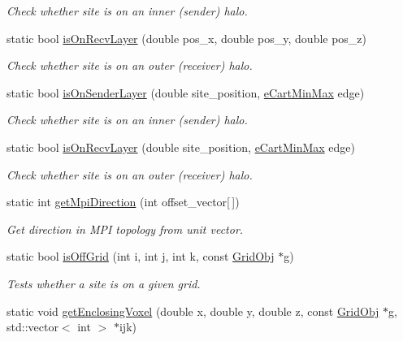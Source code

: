 \begin{DoxyCompactItemize}
\begin{DoxyCompactList}\small\item\em Check whether site is on an inner (sender) halo. \end{DoxyCompactList}\item 
static bool \hyperlink{class_grid_utils_abfec29d90b6942de2f3c52c225a4d888}{is\+On\+Recv\+Layer} (double pos\+\_\+x, double pos\+\_\+y, double pos\+\_\+z)
\begin{DoxyCompactList}\small\item\em Check whether site is on an outer (receiver) halo. \end{DoxyCompactList}\item 
static bool \hyperlink{class_grid_utils_a9179e27b25b1be249edd6d22455d57bd}{is\+On\+Sender\+Layer} (double site\+\_\+position, \hyperlink{_grid_utils_8h_a0cc91691e907a6a03b129d18a62fe33d}{e\+Cart\+Min\+Max} edge)
\begin{DoxyCompactList}\small\item\em Check whether site is on an inner (sender) halo. \end{DoxyCompactList}\item 
static bool \hyperlink{class_grid_utils_a381a3ef0d42132313081b5c06f732092}{is\+On\+Recv\+Layer} (double site\+\_\+position, \hyperlink{_grid_utils_8h_a0cc91691e907a6a03b129d18a62fe33d}{e\+Cart\+Min\+Max} edge)
\begin{DoxyCompactList}\small\item\em Check whether site is on an outer (receiver) halo. \end{DoxyCompactList}\item 
static int \hyperlink{class_grid_utils_a1a59da2eb58afd9e785b45b23ad962df}{get\+Mpi\+Direction} (int offset\+\_\+vector\mbox{[}$\,$\mbox{]})
\begin{DoxyCompactList}\small\item\em Get direction in M\+PI topology from unit vector. \end{DoxyCompactList}\item 
static bool \hyperlink{class_grid_utils_acb35c1a485e74c0b2794b84573b5e50f}{is\+Off\+Grid} (int i, int j, int k, const \hyperlink{class_grid_obj}{Grid\+Obj} $\ast$g)
\begin{DoxyCompactList}\small\item\em Tests whether a site is on a given grid. \end{DoxyCompactList}\item 
static void \hyperlink{class_grid_utils_ad0c030776101d001fda37eb7f90d2b20}{get\+Enclosing\+Voxel} (double x, double y, double z, const \hyperlink{class_grid_obj}{Grid\+Obj} $\ast$g, std\+::vector$<$ int $>$ $\ast$ijk)

\end{DoxyCompactItemize}
